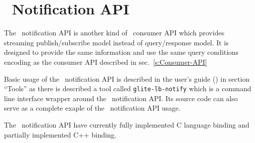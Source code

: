 %
%
%
%

\section{\LB\ Notification API}
\label{s:Notification-API}

The \LB\ notification API is another kind of \LB\ consumer API which
provides streaming publish/subscribe model instead of query/response
model. It is designed to provide the same information and use the same
query conditions encoding as the consumer API described in
sec.~\ref{s:Consumer-API}

Basic usage of the \LB\ notification API is described in the \LB
user's guide (\cite{lbug}) in section ``Tools'' as there is described
a tool called \verb'glite-lb-notify' which is a command line interface
wrapper around the \LB\ notification API. Its source code can also
serve as a complete exaple of the \LB\ notification API usage.

The \LB\ notification API have currently fully implemented C language
binding and partially implemented C++ binding.

